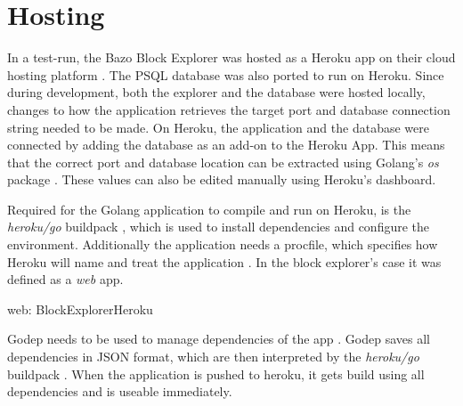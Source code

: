 \section{Hosting}
In a test-run, the Bazo Block Explorer was hosted as a Heroku app on their cloud hosting platform \cite{heroku}. The PSQL database was also ported to run on Heroku. Since during development, both the explorer and the database were hosted locally, changes to how the application retrieves the target port and database connection string needed to be made. On Heroku, the application and the database were connected by adding the database as an add-on to the Heroku App. This means that the correct port and database location can be extracted using Golang's \emph{os} package \cite{os}. These values can also be edited manually using Heroku's dashboard.

Required for the Golang application to compile and run on Heroku, is the \emph{heroku/go} buildpack \cite{buildpack}, which is used to install dependencies and configure the environment. Additionally the application needs a procfile, which specifies how Heroku will name and treat the application \cite{procfile}. In the block explorer's case it was defined as a \emph{web} app.
\begin{framed}
web: BlockExplorerHeroku
\end{framed}
Godep needs to be used to manage dependencies of the app \cite{godep}. Godep saves all dependencies in JSON \cite{json} format, which are then interpreted by the \emph{heroku/go} buildpack \cite{buildpack}. When the application is pushed to heroku, it gets build using all dependencies and is useable immediately.

